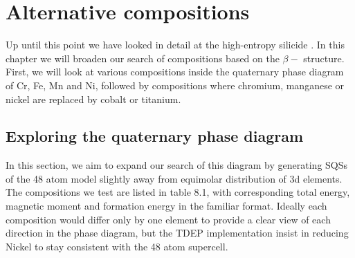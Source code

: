 \chapter{Alternative compositions}
\label{sec:comps}

Up until this point we have looked in detail at the high-entropy silicide . In this chapter we will broaden our search of compositions based on the $\beta-$  structure. First, we will look at various compositions inside the quaternary phase diagram of Cr, Fe, Mn and Ni, followed by compositions where chromium, manganese or nickel are replaced by cobalt or titanium. 

\section{Exploring the quaternary phase diagram}
In this section, we aim to expand our search of this diagram by generating SQSs of the 48 atom model slightly away from equimolar distribution of 3d elements. The compositions we test are listed in table 8.1, with corresponding total energy, magnetic moment and formation energy in the familiar format. Ideally each composition would differ only by one element to provide a clear view of each direction in the phase diagram, but the TDEP implementation insist in reducing Nickel to stay consistent with the 48 atom supercell. 

